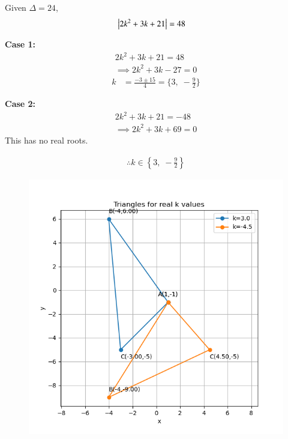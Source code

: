 \documentclass[journal]{IEEEtran}
\begin{document}
Given $\Delta=24$,
\begin{align}
    \left\vert2k^2+3k+21\right\vert &= 48
\end{align}

\textbf{Case 1:}
\begin{align}
    2k^2+3k+21 = 48 \\
    \implies 2k^2+3k-27=0
\end{align}
\begin{align}
    k &= \frac{-3\pm 15}{4} = \{3,\;-\tfrac{9}{2}\}
\end{align}

\textbf{Case 2:}
\begin{align}
    2k^2+3k+21 = -48 \\
    \implies 2k^2+3k+69=0
\end{align}
This has no real roots.

\begin{align}
    \therefore k \in \left\{3,\; -\tfrac{9}{2}\right\}
\end{align}


  

\begin{figure}[h!]
    \centering
    \includegraphics[width=\columnwidth, keepaspectratio]{figs/triangle_area.png}
    \label{fig:triangle_area}
\end{figure}
\end{document}
